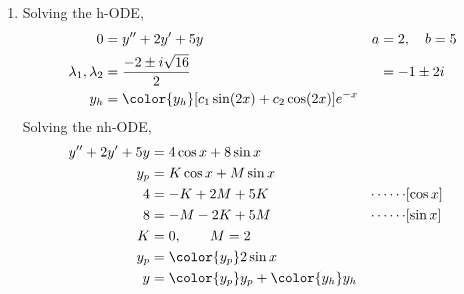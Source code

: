 \begin{enumerate}
    \item Solving the h-ODE,
          \begin{align}
              0                        & = y'' + 2y' + 5y               &
              a                        & = 2, \quad b = 5                 \\
              \lambda_{1}, \lambda_{2} & = \frac{-2 \pm i\sqrt{16}}{2}  &
                                       & = -1 \pm 2i                      \\
              y_{h}                    & = \color{y_h} [c_{1}\sin(2x) +
                  c_{2}\cos(2x)]e^{-x}
          \end{align}
          Solving the nh-ODE,
          \begin{align}
              y'' + 2y' + 5y & = 4\cos x + 8\sin x                           \\
              y_{p}          & = K \cos x + M \sin x                         \\
              4              & = -K + 2M + 5K                              &
              \cdots\cdots   & [\cos x]                                      \\
              8              & = -M - 2K + 5M                              &
              \cdots\cdots   & [\sin x]                                      \\
              K              & = 0, \qquad M = 2                             \\
              y_{p}          & = \color{y_p} 2\sin x                         \\
              y              & = {\color{y_p} y_{p}} + {\color{y_h} y_{h}}
          \end{align}


\end{enumerate}
